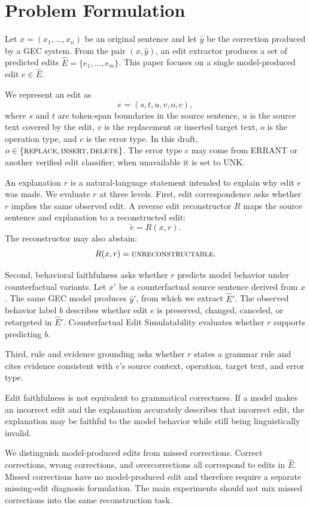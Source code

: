 \section{Problem Formulation}

Let \(x=(x_1,\ldots,x_n)\) be an original sentence and let \(\hat{y}\) be the correction produced by a GEC system. From the pair \((x,\hat{y})\), an edit extractor produces a set of predicted edits \(\hat{E}=\{e_1,\ldots,e_m\}\). This paper focuses on a single model-produced edit \(e\in \hat{E}\).

We represent an edit as
\[
e=(s,t,u,v,o,c),
\]
where \(s\) and \(t\) are token-span boundaries in the source sentence, \(u\) is the source text covered by the edit, \(v\) is the replacement or inserted target text, \(o\) is the operation type, and \(c\) is the error type. In this draft, \(o\in\{\textsc{replace},\textsc{insert},\textsc{delete}\}\). The error type \(c\) may come from ERRANT or another verified edit classifier; when unavailable it is set to \textsc{UNK}.

An explanation \(r\) is a natural-language statement intended to explain why edit \(e\) was made. We evaluate \(r\) at three levels. First, edit correspondence asks whether \(r\) implies the same observed edit. A reverse edit reconstructor \(R\) maps the source sentence and explanation to a reconstructed edit:
\[
\tilde{e} = R(x,r).
\]
The reconstructor may also abstain:
\[
R(x,r)=\textsc{unreconstructable}.
\]

Second, behavioral faithfulness asks whether \(r\) predicts model behavior under counterfactual variants. Let \(x'\) be a counterfactual source sentence derived from \(x\). The same GEC model produces \(\hat{y}'\), from which we extract \(\hat{E}'\). The observed behavior label \(b\) describes whether edit \(e\) is preserved, changed, canceled, or retargeted in \(\hat{E}'\). Counterfactual Edit Simulatability evaluates whether \(r\) supports predicting \(b\).

Third, rule and evidence grounding asks whether \(r\) states a grammar rule and cites evidence consistent with \(e\)'s source context, operation, target text, and error type.

Edit faithfulness is not equivalent to grammatical correctness. If a model makes an incorrect edit and the explanation accurately describes that incorrect edit, the explanation may be faithful to the model behavior while still being linguistically invalid.

We distinguish model-produced edits from missed corrections. Correct corrections, wrong corrections, and overcorrections all correspond to edits in \(\hat{E}\). Missed corrections have no model-produced edit and therefore require a separate missing-edit diagnosis formulation. The main experiments should not mix missed corrections into the same reconstruction task.
